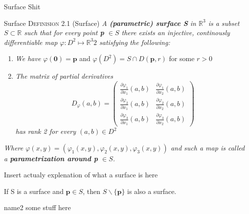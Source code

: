 \documentclass[12pt, letterpaper]{article}
\begin{document}
\begin{section}{Surface Shit}

  \begin{subsection}{Surface}
    \textsc{Definision 2.1} (Surface) \textit{A \textbf{(parametric) surface S} in \(\mathbb{R}^{3}\) is a subset \(S \subset \mathbb{R}\)
      such that for every point \textbf{p} \(\in S\) there exists an injective, continously differentiable map \(\varphi: D^{2} \mapsto \mathbb{R}^{3}2\)
      satisfying the following:}
    \begin{enumerate}
      \item \textit{We have \(\varphi(\textbf{0}) = \textbf{p}\)} and \(\varphi(D^{2}) = S \cap D(\textbf{p}, r)\) for some \(r > 0\)
      \item \textit{The matrix of partial derivatives}
            \textit{\[ D_{\varphi}(a, b) = \begin{pmatrix}
              \frac{\partial \varphi_{1}}{\partial x_{1}}(a, b) & \frac{\partial \varphi_{1}}{\partial x_{2}}(a, b) \\
              \frac{\partial \varphi_{2}}{\partial x_{1}}(a, b) & \frac{\partial \varphi_{2}}{\partial x_{2}}(a, b) \\
              \frac{\partial \varphi_{3}}{\partial x_{1}}(a, b) & \frac{\partial \varphi_{3}}{\partial x_{2}}(a, b)
            \end{pmatrix}\]}
            \textit{has rank 2 for every \((a, b) \in D^{2}\)}
    \end{enumerate}
    \textit{Where \(\varphi(x, y) = (\varphi_{1}(x, y), \varphi_{2}(x, y), \varphi_{3}(x, y))\) and such a map is called a
    \textbf{parametrization around p} \(\in S\).}

    Insert actualy explenation of what a surface is here

    If S is a surface and \(\textbf{p} \in S\), then \(S \backslash{} \{{} \textbf{p} \}{}\) is also a surface.
  \end{subsection}

  \begin{subsection}{name2}
    some stuff here
  \end{subsection}

\end{section}
\end{document}
